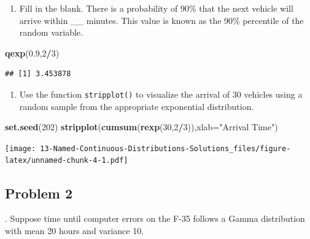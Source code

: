 \documentclass[
]{book}
\newenvironment{Shaded}{\begin{snugshade}}{\end{snugshade}}
\newcommand{\DataTypeTok}[1]{\textcolor[rgb]{0.13,0.29,0.53}{#1}}
\newcommand{\DecValTok}[1]{\textcolor[rgb]{0.00,0.00,0.81}{#1}}
\newcommand{\FloatTok}[1]{\textcolor[rgb]{0.00,0.00,0.81}{#1}}
\newcommand{\KeywordTok}[1]{\textcolor[rgb]{0.13,0.29,0.53}{\textbf{#1}}}
\newcommand{\NormalTok}[1]{#1}
\newcommand{\OperatorTok}[1]{\textcolor[rgb]{0.81,0.36,0.00}{\textbf{#1}}}
\newcommand{\StringTok}[1]{\textcolor[rgb]{0.31,0.60,0.02}{#1}}
\providecommand{\tightlist}{%
  \setlength{\itemsep}{0pt}\setlength{\parskip}{0pt}}
\begin{document}
\begin{enumerate}
\def\labelenumi{\alph{enumi}.}
\setcounter{enumi}{4}
\tightlist
\item
  Fill in the blank. There is a probability of 90\% that the next vehicle will arrive within \_\_ minutes. This value is known as the 90\% percentile of the random variable.
\end{enumerate}

\begin{Shaded}
\begin{Highlighting}[]
\KeywordTok{qexp}\NormalTok{(}\FloatTok{0.9}\NormalTok{,}\DecValTok{2}\OperatorTok{/}\DecValTok{3}\NormalTok{)}
\end{Highlighting}
\end{Shaded}

\begin{verbatim}
## [1] 3.453878
\end{verbatim}

\begin{enumerate}
\def\labelenumi{\alph{enumi}.}
\setcounter{enumi}{5}
\tightlist
\item
  Use the function \texttt{stripplot()} to visualize the arrival of 30 vehicles using a random sample from the appropriate exponential distribution.
\end{enumerate}

\begin{Shaded}
\begin{Highlighting}[]
\KeywordTok{set.seed}\NormalTok{(}\DecValTok{202}\NormalTok{)}
\KeywordTok{stripplot}\NormalTok{(}\KeywordTok{cumsum}\NormalTok{(}\KeywordTok{rexp}\NormalTok{(}\DecValTok{30}\NormalTok{,}\DecValTok{2}\OperatorTok{/}\DecValTok{3}\NormalTok{)),}\DataTypeTok{xlab=}\StringTok{"Arrival Time"}\NormalTok{)}
\end{Highlighting}
\end{Shaded}

\texttt{[image: 13-Named-Continuous-Distributions-Solutions\_files/figure-latex/unnamed-chunk-4-1.pdf]}

\newpage

\hypertarget{problem-2-12}{%
\subsection{Problem 2}\label{problem-2-12}}

. Suppose time until computer errors on the F-35 follows a Gamma distribution with mean 20 hours and variance 10.
\end{document}
